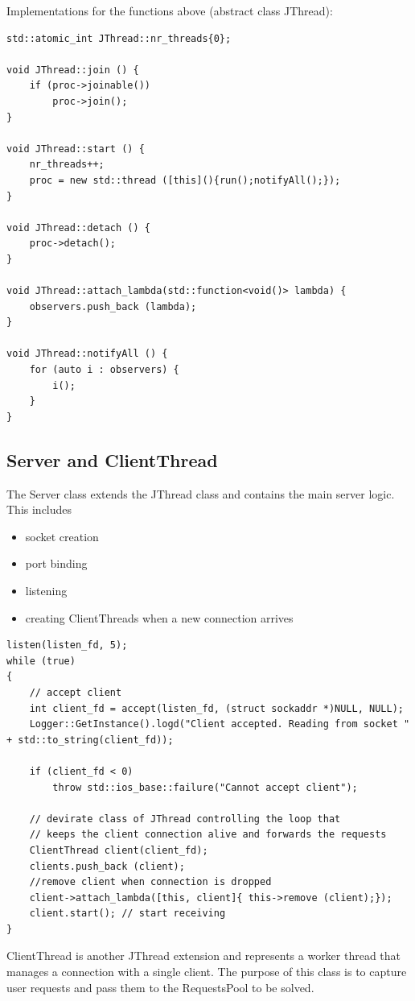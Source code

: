 \documentclass{llncs}
\begin{document}
			
Implementations for the functions above (abstract class JThread):
			\begin{lstlisting}
std::atomic_int JThread::nr_threads{0};
			
void JThread::join () {
	if (proc->joinable())
		proc->join();
}
			
void JThread::start () {
	nr_threads++;
	proc = new std::thread ([this](){run();notifyAll();});
}
			
void JThread::detach () {
	proc->detach();
}
			
void JThread::attach_lambda(std::function<void()> lambda) {
	observers.push_back (lambda);
}
			
void JThread::notifyAll () {
	for (auto i : observers) {
		i();
	}
}
			\end{lstlisting}
			\newpage
		\subsection{Server and ClientThread}
			The Server class extends the JThread class and contains the main server logic. This includes
			\begin{itemize}
				\item socket creation
				\item port binding
				\item listening
				\item creating ClientThreads when a new connection arrives
			\end{itemize}
			
			\begin{lstlisting}
listen(listen_fd, 5);
while (true)
{
	// accept client
	int client_fd = accept(listen_fd, (struct sockaddr *)NULL, NULL);
	Logger::GetInstance().logd("Client accepted. Reading from socket " + std::to_string(client_fd));
			
	if (client_fd < 0)
		throw std::ios_base::failure("Cannot accept client");
			
	// devirate class of JThread controlling the loop that
	// keeps the client connection alive and forwards the requests
	ClientThread client(client_fd);
	clients.push_back (client);
	//remove client when connection is dropped
	client->attach_lambda([this, client]{ this->remove (client);});
	client.start(); // start receiving
}
			\end{lstlisting}
			
			ClientThread is another JThread extension and represents a worker thread that manages a connection with a single client. The purpose of this class is to capture user requests and pass them to the RequestsPool to be solved.
\end{document}
